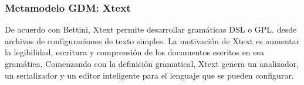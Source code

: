 \subsubsection*{Metamodelo GDM: Xtext}
De acuerdo con Bettini\cite{bettini_implementing_2016}, Xtext permite desarrollar gramáticas DSL o GPL. desde archivos de configuraciones de texto simples. La motivación de Xtext es aumentar la legibilidad, escritura y comprensión de los documentos escritos en esa gramática. Comenzando con la definición gramatical, Xtext genera un analizador, un serializador y un editor inteligente para el lenguaje que se pueden configurar.